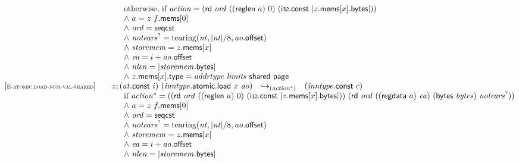 $$\begin{array}[t]{@{}lrcl@{}l@{}}
& \multicolumn{4}{@{}l@{}}{\quad
\quad
\begin{array}[t]{@{}l@{}}
\mbox{otherwise, if}~ {\mathit{action}} = (\mathsf{rd}~{\mathit{ord}}~((\mathsf{reglen}~a)~0)~(\mathsf{i{\scriptstyle 32}}{.}\mathsf{const}~{|z{.}\mathsf{mems}{}[x]{.}\mathsf{bytes}|})) \\
{\land}~ a = z~f{.}\mathsf{mems}{}[0] \\
{\land}~ {\mathit{ord}} = \mathsf{seqcst} \\
{\land}~ {{\mathit{notears}}^?} = {\mathrm{tearing}}({\mathit{nt}}, {|{\mathit{nt}}|} / 8, {\mathit{ao}}{.}\mathsf{offset}) \\
{\land}~ {\mathit{storemem}} = z{.}\mathsf{mems}{}[x] \\
{\land}~ {\mathit{ea}} = i + {\mathit{ao}}{.}\mathsf{offset} \\
{\land}~ {\mathit{nlen}} = {|{\mathit{storemem}}{.}\mathsf{bytes}|} \\
{\land}~ z{.}\mathsf{mems}{}[x]{.}\mathsf{type} = {\mathit{addrtype}}~{\mathit{limits}}~\mathsf{shared}~\mathsf{page} \\
\end{array}
} \\
{[\textsc{\scriptsize E{-}atomic.load{-}num{-}val{-}shared}]} \quad & z ; ({\mathit{at}}{.}\mathsf{const}~i)~({\mathit{inntype}}{.}\mathsf{atomic}{.}\mathsf{load}~x~{\mathit{ao}}) & {\hookrightarrow}_{({{\mathit{action}}^\ast})} {} & ({\mathit{inntype}}{.}\mathsf{const}~c) &  \\
& \multicolumn{4}{@{}l@{}}{\quad
\quad
\begin{array}[t]{@{}l@{}}
\mbox{if}~ {{\mathit{action}}^\ast} = ((\mathsf{rd}~{\mathit{ord}}~((\mathsf{reglen}~a)~0)~(\mathsf{i{\scriptstyle 32}}{.}\mathsf{const}~{|z{.}\mathsf{mems}{}[x]{.}\mathsf{bytes}|}))~(\mathsf{rd}~{\mathit{ord}}~((\mathsf{regdata}~a)~{\mathit{ea}})~(\mathsf{bytes}~{\mathit{bytes}})~{{\mathit{notears}}^?})) \\
{\land}~ a = z~f{.}\mathsf{mems}{}[0] \\
{\land}~ {\mathit{ord}} = \mathsf{seqcst} \\
{\land}~ {{\mathit{notears}}^?} = {\mathrm{tearing}}({\mathit{nt}}, {|{\mathit{nt}}|} / 8, {\mathit{ao}}{.}\mathsf{offset}) \\
{\land}~ {\mathit{storemem}} = z{.}\mathsf{mems}{}[x] \\
{\land}~ {\mathit{ea}} = i + {\mathit{ao}}{.}\mathsf{offset} \\
{\land}~ {\mathit{nlen}} = {|{\mathit{storemem}}{.}\mathsf{bytes}|} \\

\end{array}}
\end{array}$$
